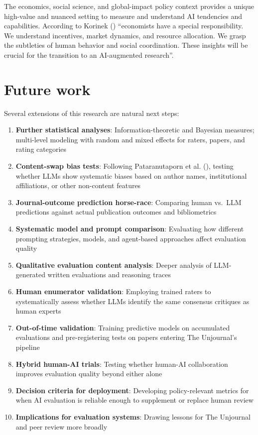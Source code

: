 \documentclass[
  11pt,
  letterpaper,
  DIV=11,
  numbers=noendperiod]{scrreprt}
\begin{document}
The economics, social science, and global-impact policy context provides
a unique high-value and nuanced setting to measure and understand AI
tendencies and capabilities. According to Korinek
() ``economists have a special
responsibility. We understand incentives, market dynamics, and resource
allocation. We grasp the subtleties of human behavior and social
coordination. These insights will be crucial for the transition to an
AI-augmented research''.

\section{Future work}\label{future-work}

Several extensions of this research are natural next steps:

\begin{enumerate}
\def\labelenumi{\arabic{enumi}.}
\item
  \textbf{Further statistical analyses}: Information-theoretic and
  Bayesian measures; multi-level modeling with random and mixed effects
  for raters, papers, and rating categories
\item
  \textbf{Content-swap bias tests}: Following Pataranutaporn et al.
  (), testing whether LLMs show
  systematic biases based on author names, institutional affiliations,
  or other non-content features
\item
  \textbf{Journal-outcome prediction horse-race}: Comparing human
  vs.~LLM predictions against actual publication outcomes and
  bibliometrics
\item
  \textbf{Systematic model and prompt comparison}: Evaluating how
  different prompting strategies, models, and agent-based approaches
  affect evaluation quality
\item
  \textbf{Qualitative evaluation content analysis}: Deeper analysis of
  LLM-generated written evaluations and reasoning traces
\item
  \textbf{Human enumerator validation}: Employing trained raters to
  systematically assess whether LLMs identify the same consensus
  critiques as human experts
\item
  \textbf{Out-of-time validation}: Training predictive models on
  accumulated evaluations and pre-registering tests on papers entering
  The Unjournal's pipeline
\item
  \textbf{Hybrid human-AI trials}: Testing whether human-AI
  collaboration improves evaluation quality beyond either alone
\item
  \textbf{Decision criteria for deployment}: Developing policy-relevant
  metrics for when AI evaluation is reliable enough to supplement or
  replace human review
\item
  \textbf{Implications for evaluation systems}: Drawing lessons for The
  Unjournal and peer review more broadly
\end{enumerate}
\end{document}
